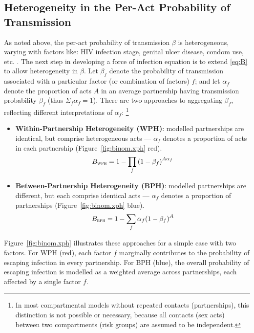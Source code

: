 \subsection{Heterogeneity in the Per-Act Probability of Transmission}\label{foi.prior.bhet}
As noted above, the per-act probability of transmission $\beta$ is heterogeneous,
varying with factors like: HIV infection stage, genital ulcer disease, condom use, etc.
\cite{Boily2009,Giannou2016}.
The next step in developing a force of infection equation is to extend \eqref{eq:B}
to allow heterogeneity in $\beta$.
Let $\beta_f$ denote the probability of transmission associated
with a particular factor (or combination of factors) $f$; and
let $\alpha_f$ denote the proportion of acts $A$ in an average partnership
having transmission probability $\beta_f$
(thus $\Sigma_f \alpha_f = 1$).
There are two approaches to aggregating $\beta_f$,
reflecting different interpretations of $\alpha_f$:%
\footnote{In most compartmental models without repeated contacts (partnerships),
  this distinction is not possible or necessary, because
  all contacts (sex acts) between two compartments (risk groups) are assumed to be independent.}
\begin{itemize}
  \item \textbf{{Within}-Partnership Heterogeneity (WPH)}:
  modelled partnerships are identical, but comprise heterogeneous acts
  --- $\alpha_f$ denotes a proportion of acts in each partnership
  (Figure~\ref{fig:binom.xph} red).
  \begin{equation}\label{eq:B.wph}
    B_{\textsc{wph}} = 1 - \prod_f {(1 - \beta_f)}^{A\alpha_f}
  \end{equation}
  \item \textbf{{Between}-Partnership Heterogeneity (BPH)}:
  modelled partnerships are different, but each comprise identical acts
  --- $\alpha_f$ denotes a proportion of partnerships
  (Figure~\ref{fig:binom.xph} blue).
  \begin{equation}\label{eq:B.bph}
    B_{\textsc{bph}} = 1 - \sum_f \alpha_f {(1 - \beta_f)}^{A}
  \end{equation}
\end{itemize}
Figure~\ref{fig:binom.xph} illustrates these approaches for a simple case with two factors.
For WPH (red), each factor $f$ marginally contributes to
the probability of escaping infection in every partnership.
For BPH (blue), the overall probability of escaping infection is modelled as
a weighted average across partnerships, each affected by a single factor $f$.
